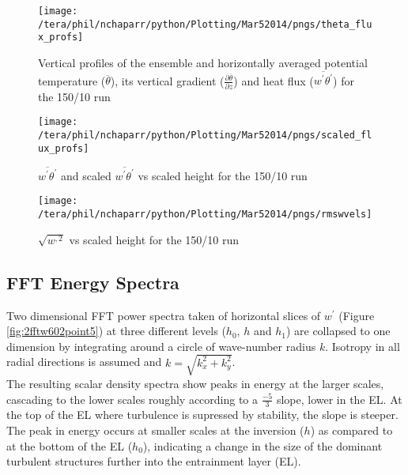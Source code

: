 \begin{figure}[htbp]
    \centering
    \texttt{[image: /tera/phil/nchaparr/python/Plotting/Mar52014/pngs/theta\_flux\_profs]}
    \caption{Vertical profiles of the ensemble and horizontally averaged potential temperature ($\overline{\theta}$), its vertical gradient ($\frac{\partial \overline{\theta}}{\partial z}$)  
     and heat flux ($\overline{w^{'}\theta^{'}}$) for the 150/10 run}
    \label{fig:tempgradfluxprofs15010}   %
\end{figure}

\begin{figure}[htbp]
    \centering
    \texttt{[image: /tera/phil/nchaparr/python/Plotting/Mar52014/pngs/scaled\_flux\_profs]}
    \caption{$\overline{w^{'}\theta^{'}}$ and scaled $\overline{w^{'}\theta^{'}}$  vs scaled height for the 150/10 run}
    \label{fig:scaledfluxprofs15010}   %
\end{figure}

\begin{figure}[htbp]
    \centering
    \texttt{[image: /tera/phil/nchaparr/python/Plotting/Mar52014/pngs/rmswvels]}
    \caption{$\sqrt{w^{,2}}$ vs scaled height for the 150/10 run}
    \label{fig:rmswvelprofs15010}   %
\end{figure}

\clearpage
\subsection{FFT Energy Spectra}
\FloatBarrier

Two dimensional \acs{FFT} power spectra taken of horizontal slices of $w^{'}$ 
(Figure \ref{fig:2fftw602point5}) at three different levels ($h_{0}$, $h$ and $h_{1}$) are collapsed to 
one dimension by integrating around a circle of wave-number radius $k$.  Isotropy in all radial 
directions is assumed and $k = \sqrt{k_{x}^{2} + k_{y}^{2}}$.  \\

The resulting scalar density spectra show peaks in  energy at the larger scales, cascading to the lower 
scales roughly according to a $\frac{-5}{3}$ slope, lower in the \acs{EL}.  At the top of the \acs{EL} 
where turbulence is supressed by stability, the slope is steeper.  The peak in energy occurs at smaller 
scales at the inversion ($h$) as compared to at the bottom of the \acs{EL} ($h_{0}$), indicating a 
change in the size of the dominant turbulent structures further into the entrainment layer (\acs{EL}).\\

